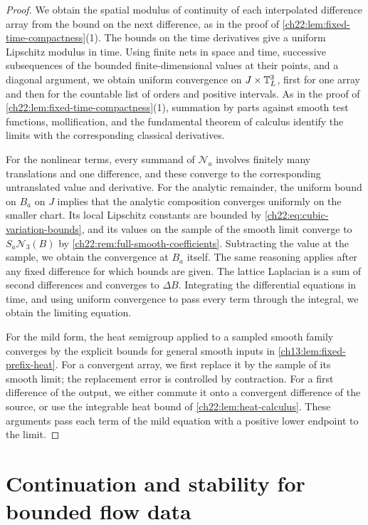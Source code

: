 \begin{proof}
We obtain the spatial modulus of continuity of each interpolated difference array from the bound on the next difference, as in the proof of \cref{ch22:lem:fixed-time-compactness}(1). The bounds on the time derivatives give a uniform Lipschitz modulus in time. Using finite nets in space and time, successive subsequences of the bounded finite-dimensional values at their points, and a diagonal argument, we obtain uniform convergence on $J\times\mathbb T_L^3$, first for one array and then for the countable list of orders and positive intervals. As in the proof of \cref{ch22:lem:fixed-time-compactness}(1), summation by parts against smooth test functions, mollification, and the fundamental theorem of calculus identify the limits with the corresponding classical derivatives.

For the nonlinear terms, every summand of $\mathcal N_a$ involves finitely many translations and one difference, and these converge to the corresponding untranslated value and derivative. For the analytic remainder, the uniform bound on $B_a$ on $J$ implies that the analytic composition converges uniformly on the smaller chart. Its local Lipschitz constants are bounded by \eqref{ch22:eq:cubic-variation-bounds}, and its values on the sample of the smooth limit converge to $S_a\mathscr N_3(B)$ by \cref{ch22:rem:full-smooth-coefficients}. Subtracting the value at the sample, we obtain the convergence at $B_a$ itself. The same reasoning applies after any fixed difference for which bounds are given. The lattice Laplacian is a sum of second differences and converges to $\Delta B$. Integrating the differential equations in time, and using uniform convergence to pass every term through the integral, we obtain the limiting equation.

For the mild form, the heat semigroup applied to a sampled smooth family converges by the explicit bounds for general smooth inputs in \cref{ch13:lem:fixed-prefix-heat}. For a convergent array, we first replace it by the sample of its smooth limit; the replacement error is controlled by contraction. For a first difference of the output, we either commute it onto a convergent difference of the source, or use the integrable heat bound of \cref{ch22:lem:heat-calculus}. These arguments pass each term of the mild equation with a positive lower endpoint to the limit.
\end{proof}

\section{Continuation and stability for bounded flow data}\label{ch22:sec:bounded-data}

